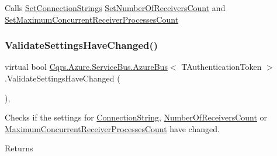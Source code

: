 Calls \hyperlink{classCqrs_1_1Azure_1_1ServiceBus_1_1AzureBus_a8a1be9145b0a92c0037ef1b8b4cc79d9_a8a1be9145b0a92c0037ef1b8b4cc79d9}{Set\+Connection\+Strings} \hyperlink{classCqrs_1_1Azure_1_1ServiceBus_1_1AzureBus_a7633f211059ee45dfb907b16a955a790_a7633f211059ee45dfb907b16a955a790}{Set\+Number\+Of\+Receivers\+Count} and \hyperlink{classCqrs_1_1Azure_1_1ServiceBus_1_1AzureBus_a60cbe46aa3e60528dbd7e07be5132132_a60cbe46aa3e60528dbd7e07be5132132}{Set\+Maximum\+Concurrent\+Receiver\+Processes\+Count} 

\mbox{\label{classCqrs_1_1Azure_1_1ServiceBus_1_1AzureBus_a9fa1f5a74819100c40d8079ac6a6adb9_a9fa1f5a74819100c40d8079ac6a6adb9}} 
\subsubsection{\texorpdfstring{Validate\+Settings\+Have\+Changed()}{ValidateSettingsHaveChanged()}}
{\footnotesize\ttfamily virtual bool \hyperlink{classCqrs_1_1Azure_1_1ServiceBus_1_1AzureBus}{Cqrs.\+Azure.\+Service\+Bus.\+Azure\+Bus}$<$ T\+Authentication\+Token $>$.Validate\+Settings\+Have\+Changed (\begin{DoxyParamCaption}{ }\end{DoxyParamCaption})\hspace{0.3cm}{\ttfamily [protected]}, {\ttfamily [virtual]}}



Checks if the settings for \hyperlink{classCqrs_1_1Azure_1_1ServiceBus_1_1AzureBus_aaccdbc8cd25d3ae4f1a2801d2ad02a96_aaccdbc8cd25d3ae4f1a2801d2ad02a96}{Connection\+String}, \hyperlink{classCqrs_1_1Azure_1_1ServiceBus_1_1AzureBus_a65ca2b61bf8f2dba9d0e0f54ec64c2b9_a65ca2b61bf8f2dba9d0e0f54ec64c2b9}{Number\+Of\+Receivers\+Count} or \hyperlink{classCqrs_1_1Azure_1_1ServiceBus_1_1AzureBus_a6b517888d91c6a5b026cb5857e75a04f_a6b517888d91c6a5b026cb5857e75a04f}{Maximum\+Concurrent\+Receiver\+Processes\+Count} have changed. 

\begin{DoxyReturn}{Returns}

\end{DoxyReturn}



